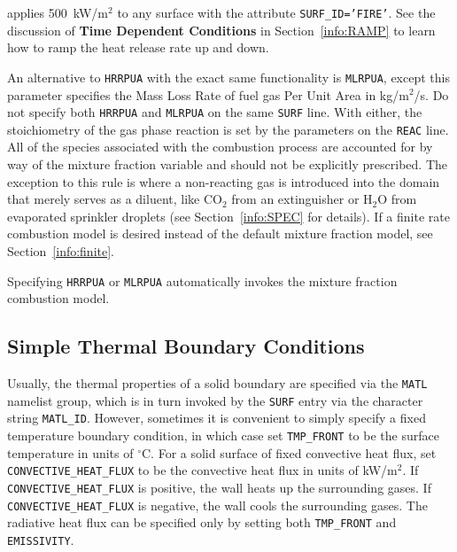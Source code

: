 \documentclass[11pt]{book}
\newcommand{\ct}{\tt\small}
\begin{document}
\noindent
applies 500~kW/m$^2$ to any surface with the attribute
{\ct SURF\_ID='FIRE'}. See the discussion of {\bf Time Dependent Conditions}
in Section~\ref{info:RAMP} to learn how to ramp the heat release rate up and down.

An alternative to {\ct HRRPUA} with the exact same functionality is
{\ct MLRPUA}, except this parameter 
specifies the Mass Loss Rate of fuel gas Per Unit Area in kg/m$^2$/s. Do not specify both
{\ct HRRPUA} and {\ct MLRPUA} on the same {\ct SURF} line. With either,
the stoichiometry of the gas phase reaction is set by the
parameters on the {\ct REAC} line. All of the
species associated with the combustion process are accounted for
by way of the mixture fraction variable and should not be
explicitly prescribed. The exception to this rule is
where a non-reacting gas is introduced into the domain that merely serves
as a diluent, like CO$_2$ from an extinguisher or H$_2$O from evaporated
sprinkler droplets (see Section~\ref{info:SPEC} for details).
If a finite rate combustion model is desired instead of the default mixture
fraction model, see Section~\ref{info:finite}.

\begin{warning}
Specifying {\ct HRRPUA} or {\ct MLRPUA} automatically invokes the mixture fraction
combustion model.
\end{warning}



\subsection{Simple Thermal Boundary Conditions}
\label{info:thermalboundary} 

Usually, the thermal properties of a solid boundary are specified via the
{\ct MATL} namelist group, which is in turn invoked by the {\ct SURF} entry via
the character string {\ct MATL\_ID}. However, sometimes it is convenient to
simply specify a fixed temperature boundary condition, in which case set
{\ct TMP\_FRONT} to be the surface temperature in units of $^\circ$C.
For a solid surface of fixed convective heat flux, set {\ct CONVECTIVE\_HEAT\_FLUX} to be
the convective heat flux in units of kW/m$^2$. If {\ct CONVECTIVE\_HEAT\_FLUX} is
positive, the wall heats up the surrounding gases. If {\ct CONVECTIVE\_HEAT\_FLUX}
is negative, the wall cools the surrounding gases. The radiative heat
flux can be specified only by setting both {\ct TMP\_FRONT} and {\ct EMISSIVITY}.
\end{document}
